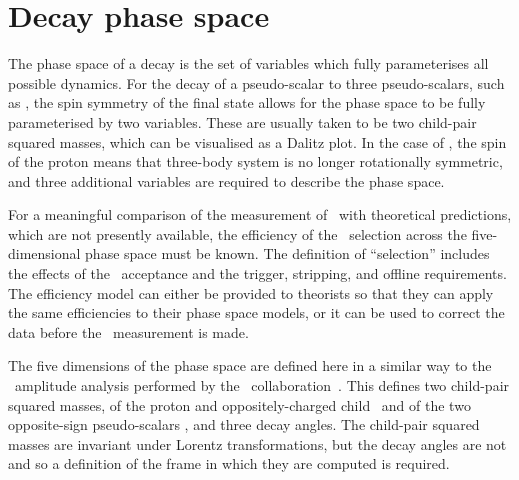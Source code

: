 \section{Decay phase space}
\label{chap:cpv:theory:phsp}

The phase space of a decay is the set of variables which fully parameterises 
all possible dynamics.
For the decay of a pseudo-scalar to three pseudo-scalars, such as 
\decay{\PDzero}{\PKshort\Ppiplus\Ppiminus}, the spin symmetry of the final 
state allows for the phase space to be fully parameterised by two variables.
These are usually taken to be two child-pair squared masses, which can be 
visualised as a Dalitz plot.
In the case of \LcTophh, the spin  of the proton means that 
three-body system is no longer rotationally symmetric, and three additional 
variables are required to describe the phase space.

For a meaningful comparison of the measurement of \dACP\ with theoretical 
predictions, which are not presently available, the efficiency of the 
\PLambdac\ selection across the five-dimensional phase space must be known.
The definition of ``selection'' includes the effects of the \lhcb\ acceptance 
and the trigger, stripping, and offline requirements.
The efficiency model can either be provided to theorists so that they can apply 
the same efficiencies to their phase space models, or it can be used to correct 
the data before the \dACP\ measurement is made.

The five dimensions of the phase space are defined here in a similar way to the 
\LcTopKpi\ amplitude analysis performed by the \esno\ 
collaboration~\cite{Aitala:1999uq}.
This defines two child-pair squared masses, of the proton and 
oppositely-charged child \msqphm\ and of the two opposite-sign pseudo-scalars 
\msqhh, and three decay angles.
The child-pair squared masses are invariant under Lorentz transformations, but 
the decay angles are not and so a definition of the frame in which they are 
computed is required.

